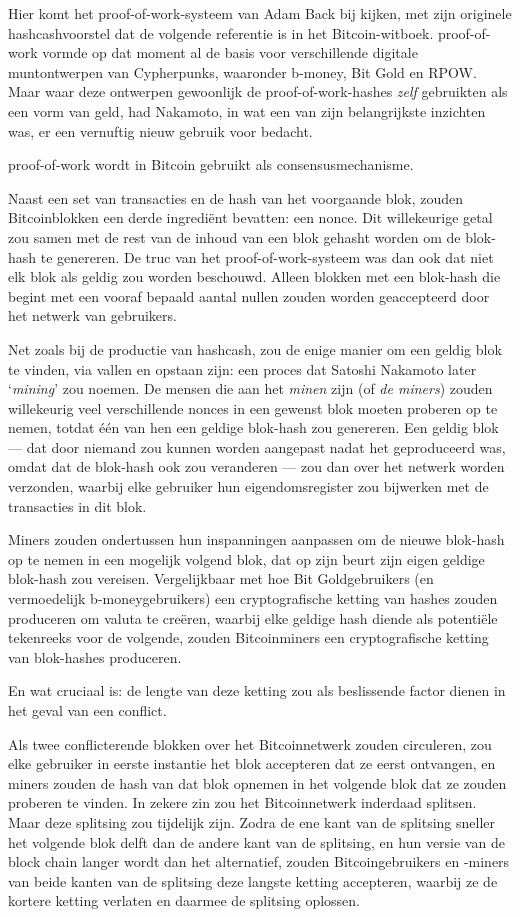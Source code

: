 \documentclass[
  a5paper,
  smalldemyvopaper,11pt,twoside,onecolumn,openright,extrafontsizes]{memoir}
\begin{document}
Hier komt het proof-of-work-systeem van Adam Back bij kijken, met zijn
originele hashcashvoorstel dat de volgende referentie is in het
Bitcoin-witboek. proof-of-work vormde op dat moment al de basis voor
verschillende digitale muntontwerpen van Cypherpunks, waaronder b-money,
Bit Gold en RPOW. Maar waar deze ontwerpen gewoonlijk de
proof-of-work-hashes \emph{zelf} gebruikten als een vorm van geld, had
Nakamoto, in wat een van zijn belangrijkste inzichten was, er een
vernuftig nieuw gebruik voor bedacht.

proof-of-work wordt in Bitcoin gebruikt als consensusmechanisme.

Naast een set van transacties en de hash van het voorgaande blok, zouden
Bitcoinblokken een derde ingrediënt bevatten: een nonce. Dit
willekeurige getal zou samen met de rest van de inhoud van een blok
gehasht worden om de blok-hash te genereren. De truc van het
proof-of-work-systeem was dan ook dat niet elk blok als geldig zou
worden beschouwd. Alleen blokken met een blok-hash die begint met een
vooraf bepaald aantal nullen zouden worden geaccepteerd door het netwerk
van gebruikers.

Net zoals bij de productie van hashcash, zou de enige manier om een
geldig blok te vinden, via vallen en opstaan zijn: een proces dat
Satoshi Nakamoto later `\emph{mining}' zou noemen. De mensen die aan het
\emph{minen} zijn (of \emph{de miners}) zouden willekeurig veel
verschillende nonces in een gewenst blok moeten proberen op te nemen,
totdat één van hen een geldige blok-hash zou genereren. Een geldig blok
--- dat door niemand zou kunnen worden aangepast nadat het geproduceerd
was, omdat dat de blok-hash ook zou veranderen --- zou dan over het
netwerk worden verzonden, waarbij elke gebruiker hun eigendomsregister
zou bijwerken met de transacties in dit blok.

Miners zouden ondertussen hun inspanningen aanpassen om de nieuwe
blok-hash op te nemen in een mogelijk volgend blok, dat op zijn beurt
zijn eigen geldige blok-hash zou vereisen. Vergelijkbaar met hoe Bit
Goldgebruikers (en vermoedelijk b-moneygebruikers) een cryptografische
ketting van hashes zouden produceren om valuta te creëren, waarbij elke
geldige hash diende als potentiële tekenreeks voor de volgende, zouden
Bitcoinminers een cryptografische ketting van blok-hashes produceren.

En wat cruciaal is: de lengte van deze ketting zou als beslissende
factor dienen in het geval van een conflict.

Als twee conflicterende blokken over het Bitcoinnetwerk zouden
circuleren, zou elke gebruiker in eerste instantie het blok accepteren
dat ze eerst ontvangen, en miners zouden de hash van dat blok opnemen in
het volgende blok dat ze zouden proberen te vinden. In zekere zin zou
het Bitcoinnetwerk inderdaad splitsen. Maar deze splitsing zou tijdelijk
zijn. Zodra de ene kant van de splitsing sneller het volgende blok delft
dan de andere kant van de splitsing, en hun versie van de block chain
langer wordt dan het alternatief, zouden Bitcoingebruikers en -miners
van beide kanten van de splitsing deze langste ketting accepteren,
waarbij ze de kortere ketting verlaten en daarmee de splitsing oplossen.
\end{document}
